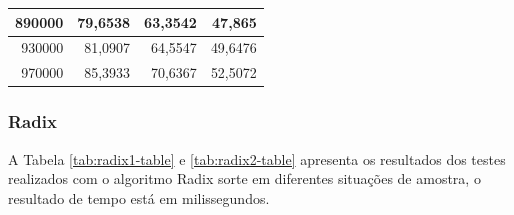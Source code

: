 \documentclass[a4paper, 12pt]{article}
\begin{document}
\begin{longtable}[c]{@{}rrrr@{}}
	\multicolumn{1}{|r|}{890000}                  & \multicolumn{1}{r|}{79,6538}                & \multicolumn{1}{r|}{63,3542}                                                           & \multicolumn{1}{r|}{47,865}                                                            \\* \midrule
	\multicolumn{1}{|r|}{930000}                  & \multicolumn{1}{r|}{81,0907}                & \multicolumn{1}{r|}{64,5547}                                                           & \multicolumn{1}{r|}{49,6476}                                                           \\* \midrule
	\multicolumn{1}{|r|}{970000}                  & \multicolumn{1}{r|}{85,3933}                & \multicolumn{1}{r|}{70,6367}                                                           & \multicolumn{1}{r|}{52,5072}                                                           \\* \bottomrule
\end{longtable}

		
		


\subsubsection{Radix}
A Tabela \ref{tab:radix1-table} e \ref{tab:radix2-table}  apresenta os resultados dos testes realizados com o algoritmo Radix sorte em diferentes situações de amostra, o resultado de tempo está em milissegundos.
\end{document}
